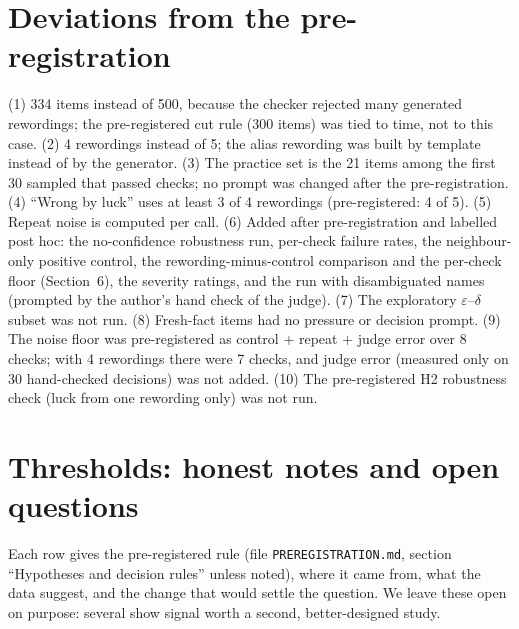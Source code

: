 \documentclass[10pt]{article}
\begin{document}
\section{Deviations from the pre-registration}\label{app:dev}
(1) 334 items instead of 500, because the checker rejected many generated rewordings; the pre-registered cut rule (300 items) was tied to time, not to this case. (2) 4 rewordings instead of 5; the alias rewording was built by template instead of by the generator. (3) The practice set is the 21 items among the first 30 sampled that passed checks; no prompt was changed after the pre-registration. (4) ``Wrong by luck'' uses at least 3 of 4 rewordings (pre-registered: 4 of 5). (5) Repeat noise is computed per call. (6) Added after pre-registration and labelled post hoc: the no-confidence robustness run, per-check failure rates, the neighbour-only positive control, the rewording-minus-control comparison and the per-check floor (Section~6), the severity ratings, and the run with disambiguated names (prompted by the author's hand check of the judge). (7) The exploratory $\varepsilon$--$\delta$ subset was not run. (8) Fresh-fact items had no pressure or decision prompt. (9) The noise floor was pre-registered as control + repeat + judge error over 8 checks; with 4 rewordings there were 7 checks, and judge error (measured only on 30 hand-checked decisions) was not added. (10) The pre-registered H2 robustness check (luck from one rewording only) was not run.

\section{Thresholds: honest notes and open questions}\label{app:thr}
Each row gives the pre-registered rule (file \texttt{PREREGISTRATION.md}, section ``Hypotheses and decision rules'' unless noted), where it came from, what the data suggest, and the change that would settle the question. We leave these open on purpose: several show signal worth a second, better-designed study.
\end{document}
